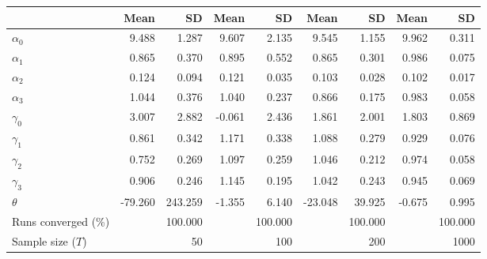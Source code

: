 
\begin{tabular}[t]{lrrrrrrrr}
\toprule
  & Mean & SD & Mean  & SD  & Mean   & SD   & Mean    & SD   \\
\midrule
$\alpha_{0}$ & 9.488 & 1.287 & 9.607 & 2.135 & 9.545 & 1.155 & 9.962 & 0.311\\
$\alpha_{1}$ & 0.865 & 0.370 & 0.895 & 0.552 & 0.865 & 0.301 & 0.986 & 0.075\\
$\alpha_{2}$ & 0.124 & 0.094 & 0.121 & 0.035 & 0.103 & 0.028 & 0.102 & 0.017\\
$\alpha_{3}$ & 1.044 & 0.376 & 1.040 & 0.237 & 0.866 & 0.175 & 0.983 & 0.058\\
$\gamma_{0}$ & 3.007 & 2.882 & -0.061 & 2.436 & 1.861 & 2.001 & 1.803 & 0.869\\
$\gamma_{1}$ & 0.861 & 0.342 & 1.171 & 0.338 & 1.088 & 0.279 & 0.929 & 0.076\\
$\gamma_{2}$ & 0.752 & 0.269 & 1.097 & 0.259 & 1.046 & 0.212 & 0.974 & 0.058\\
$\gamma_{3}$ & 0.906 & 0.246 & 1.145 & 0.195 & 1.042 & 0.243 & 0.945 & 0.069\\
$\theta$ & -79.260 & 243.259 & -1.355 & 6.140 & -23.048 & 39.925 & -0.675 & 0.995\\
Runs converged (\%) &  & 100.000 &  & 100.000 &  & 100.000 &  & 100.000\\
Sample size ($T$) &  & 50 &  & 100 &  & 200 &  & 1000\\
\bottomrule
\end{tabular}
